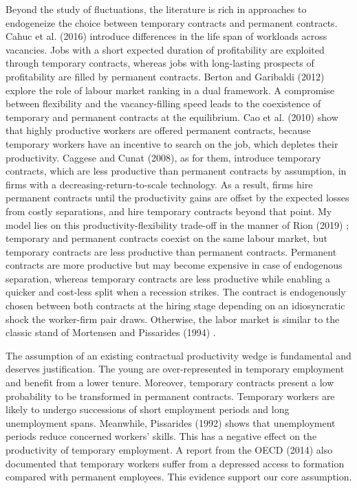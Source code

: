 \documentclass[a4paper]{article}
\begin{document}
Beyond the study of fluctuations, the literature is rich in approaches to endogeneize the choice between temporary contracts and permanent contracts. Cahuc et al. (2016) \cite{IERE:IERE12167} introduce differences in the life span of workloads across vacancies. Jobs with a short expected duration of profitability are exploited through temporary contracts, whereas jobs with long-lasting prospects of profitability are filled by permanent contracts. Berton and Garibaldi (2012) \cite{berton2012workers} explore the role of labour market ranking in a dual framework. A compromise between flexibility and the vacancy-filling speed leads to the coexistence of temporary and permanent contracts at the equilibrium. Cao et al. (2010) \cite{cao2010fixed} show that highly productive workers are offered permanent contracts, because temporary workers have an incentive to search on the job, which depletes their productivity. Caggese and Cunat (2008), as for them, introduce temporary contracts, which are less productive than permanent contracts by assumption, in firms with a decreasing-return-to-scale technology. As a result, firms hire permanent contracts until the productivity gains are offset by the expected losses from costly separations, and hire temporary contracts beyond that point. My model lies on this productivity-flexibility trade-off in the manner of Rion (2019) \cite{rion2019} ; temporary and permanent contracts coexist on the same labour market, but temporary contracts are less productive than permanent contracts. Permanent contracts are more productive but may become expensive in case of endogenous separation, whereas temporary contracts are less productive while enabling a quicker and cost-less split when a recession strikes. The contract is endogenously chosen between both contracts at the hiring stage depending on an idiosyncratic shock the worker-firm pair draws. Otherwise, the labor market is similar to the classic stand of Mortensen and Pissarides (1994) \cite{mortensen1994job}.

The assumption of an existing contractual productivity wedge is fundamental and deserves justification. The young are over-represented in temporary employment and benefit from a lower tenure. Moreover, temporary contracts present a low probability to be transformed in permanent contracts. Temporary workers are likely to undergo successions of short employment periods and long unemployment spans. Meanwhile, Pissarides (1992) \cite{pissarides1992loss} shows that unemployment periods reduce concerned  workers' skills. This has a negative effect on the productivity of temporary employment. A report from the OECD (2014) \cite{oecd2014} also documented that temporary workers suffer from a depressed access to formation compared with permanent employees. This evidence support our core assumption. 
\end{document}
